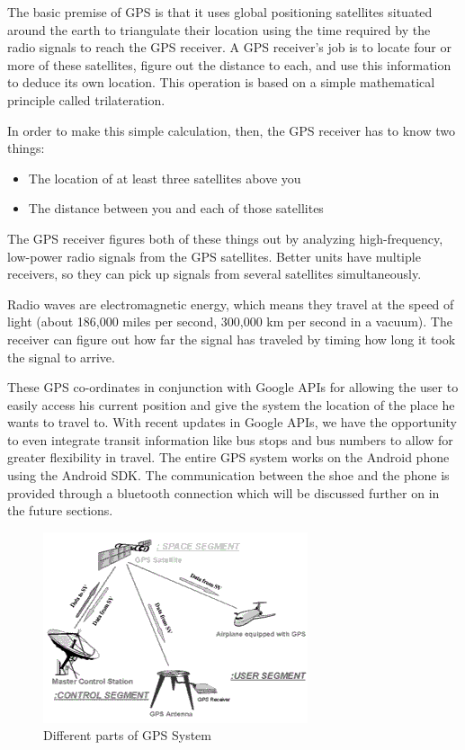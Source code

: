 \documentclass[11pt]{report}
\begin{document}
{The basic premise of GPS is that it uses global positioning satellites situated around the earth to triangulate their location using the time required by the radio signals to reach the GPS receiver\cite{gps}. A GPS receiver's job is to locate four or more of these satellites, figure out the distanc­e to each, and use this information to deduce its own location. This operation is based on a simple mathematical principle called trilateration. 

In order to make this simple calculation, then, the GPS receiver has to know two things:
\begin{itemize}
\item The location of at least three satellites above you
\item The distance between you and each of those satellites
\end{itemize}

The GPS receiver figures both of these things out by analyzing high-frequency, low-power radio signals from the GPS satellites. Better units have multiple receivers, so they can pick up signals from several satellites simultaneously.

Radio waves are electromagnetic energy, which means they travel at the speed of light (about 186,000 miles per second, 300,000 km per second in a vacuum). The receiver can figure out how far the signal has traveled by timing how long it took the signal to arrive. 

These GPS co-ordinates in conjunction with Google APIs for allowing the user to easily access his current position and give the system the location of the place he wants to travel to. With recent updates in Google APIs, we have the opportunity to even integrate transit information like bus stops and bus numbers to allow for greater flexibility in travel. The entire GPS system works on the Android phone using the Android SDK. The communication between the shoe and the phone is provided through a bluetooth connection which will be discussed further on in the future sections.

\begin{figure}[hp]
\centering
\includegraphics[scale=0.5]{fig1.png}
\caption[Different parts of GPS System]{Different parts of GPS System}
\end{figure}

}
\end{document}
